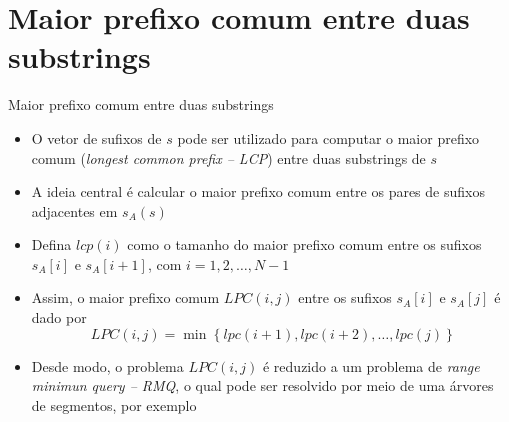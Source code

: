 \section{Maior prefixo comum entre duas substrings}

\begin{frame}[fragile]{Maior prefixo comum entre duas substrings}

    \begin{itemize}
        \item O vetor de sufixos de $s$ pode ser utilizado para computar o maior prefixo 
            comum (\textit{longest common prefix -- LCP}) entre duas substrings de $s$

        \item A ideia central é calcular o maior prefixo comum entre os pares de sufixos
            adjacentes em $s_A(s)$

        \item Defina $lcp(i)$ como o tamanho do maior prefixo comum entre os sufixos
           $s_A[i]$ e $s_A[i + 1]$, com $i = 1, 2, \ldots, N - 1$
 
        \item Assim, o maior prefixo comum $LPC(i, j)$ entre os sufixos
            $s_A[i]$ e $s_A[j]$ é dado por
        \[
            LPC(i, j) = \min\ \lbrace\ lpc(i + 1), lpc(i + 2), \ldots, lpc(j)\ \rbrace
        \]

        \item Desde modo, o problema $LPC(i, j)$ é reduzido a um problema de \textit{range 
            minimun query -- RMQ}, o qual pode ser resolvido por meio de
            uma árvores de segmentos, por exemplo
    \end{itemize}

\end{frame}

